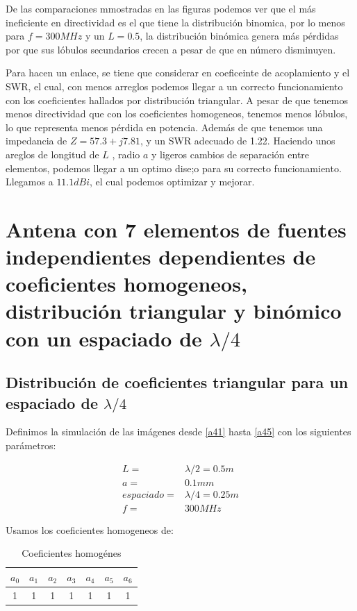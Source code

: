 \documentclass[11pt]{book}
\begin{document}
De las comparaciones mmostradas en las figuras podemos ver que el más ineficiente en directividad es el que tiene la distribución binomica, por lo menos para $f=300MHz$ y un $L=0.5$, la distribución binómica genera más pérdidas por que sus lóbulos secundarios crecen a pesar de que en número disminuyen.


Para hacen un enlace, se tiene que considerar en coeficeinte de acoplamiento y el SWR, el cual, con menos arreglos podemos llegar a un correcto funcionamiento con los coeficientes hallados por distribución triangular. A pesar de que tenemos menos directividad que con los coeficientes homogeneos, tenemos menos lóbulos, lo que representa menos pérdida en potencia. Además de que tenemos una impedancia de $Z = 57.3 + j7.81$, y un SWR adecuado de 1.22. Haciendo unos areglos de longitud de $L$ , radio $a$ y ligeros cambios de separación entre elementos, podemos llegar a un optimo dise;o para su correcto funcionamiento. Llegamos a $11.1dBi$, el cual podemos optimizar y mejorar.

\newpage


\chapter{Antena con 7 elementos de fuentes independientes dependientes de coeficientes homogeneos, distribución triangular y binómico con un espaciado de $\lambda/4$}

\newpage

\section{Distribución de coeficientes triangular para un espaciado de $\lambda/4$}

Definimos la simulación de las imágenes desde \eqref{a41} hasta \eqref{a45} con los siguientes parámetros:

\begin{align*}
	L = &\lambda/2 =  0.5m \\
	a = & 0.1mm \\
	espaciado = & \lambda / 4 = 0.25m \\
	f = & 300MHz
\end{align*}

Usamos los coeficientes homogeneos de:
\begin{table}[!ht]
	\centering
	\begin{tabular}{c|c|c|c|c|c|c}
		$a_0$ & $a_1$ & $a_2$ & $a_3$ & $a_4$ & $a_5$ & $a_6$ \\ \hline
		1 & 1 & 1 & 1 & 1 & 1 & 1 \\
	\end{tabular}
	\caption{Coeficientes homogénes}
	\label{tab:4}
\end{table}
\end{document}
